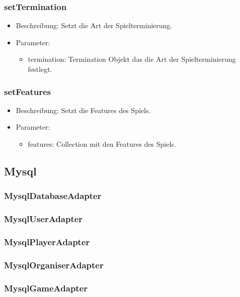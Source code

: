 \documentclass[a4paper]{scrreprt}
\begin{document}
    \subsubsection{setTermination}
    \begin{itemize}
        \item Beschreibung: Setzt die Art der Spielterminierung.
        \item Parameter:
        \begin{itemize}
            \item termination: Termination Objekt das die Art der Spielterminierung festlegt.
        \end{itemize}
    \end{itemize}

    \subsubsection{setFeatures}
    \begin{itemize}
        \item Beschreibung: Setzt die Features des Spiels.
        \item Parameter:
        \begin{itemize}
            \item features: Collection mit den Features des Spiels.
        \end{itemize}
    \end{itemize}


    \subsection{Mysql}
    \subsubsection{MysqlDatabaseAdapter}
    \subsubsection{MysqlUserAdapter}
    \subsubsection{MysqlPlayerAdapter}
    \subsubsection{MysqlOrganiserAdapter}
    \subsubsection{MysqlGameAdapter}
\end{document}
